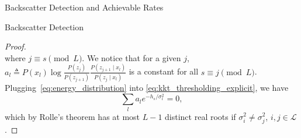 \documentclass[journal]{IEEEtran}
\begin{document}
\begin{section}{Backscatter Detection and Achievable Rates}
\begin{subsection}{Backscatter Detection}
\begin{proof}
\begin{equation}
					\label{eq:kkt_thresholding_explicit}
				\end{equation}
				where $j \equiv s \pmod L$. We notice that for a given $j$, $a_l \triangleq P(x_l) \log \frac{P(z_j)}{P(z_{j+1})} \frac{P(z_{j+1} \mid x_l)}{P(z_j \mid x_l)}$ is a constant for all $s \equiv j \pmod L$. Plugging~\eqref{eq:energy_distribution} into \eqref{eq:kkt_thresholding_explicit}, we have
				\begin{equation}
					\sum_l a_l e^{-{h_s}/{\sigma_l^2}} = 0,
					\label{eq:optimal_thresholding_condition}
				\end{equation}
				which by Rolle's theorem has at most $L-1$ distinct real roots if $\sigma_i^2 \ne \sigma_j^2$, $i,j \in \mathcal{L}$.
			\end{proof}





\end{subsection}
\end{section}
\end{document}
